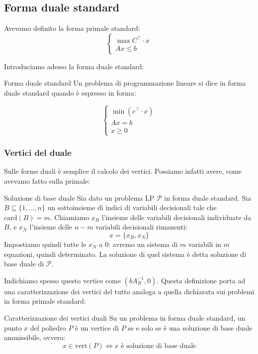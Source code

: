 \documentclass[a4paper,11pt]{article}
\begin{document}
\subsection{Forma duale standard}
Avevamo definito la forma primale standard:
\[
	\begin{cases}
		\max{C^\intercal \cdot x} \\
		Ax \leq b
	\end{cases}
\]

Introduciamo adesso la forma duale standard:
\begin{definition}{Forma duale standard}
	Un problema di programmazione lineare si dice in forma duale standard quando è espresso in forma:
	
	\[
		\begin{cases}
			\min(c^\intercal \cdot x) \\
			Ax = b \\
			x \geq 0
		\end{cases}
	\]

\end{definition}

\subsubsection{Vertici del duale}
Sulle forme duali è semplice il calcolo dei vertici. 
Possiamo infatti avere, come avevamo fatto sulla primale:
\begin{definition}{Soluzione di base duale}
	Sia dato un problema LP $\mathcal{P}$ in forma duale standard.
	Sia $B \subseteq \{ 1, ..., n \}$ un sottoinsieme di indici di variabili decisionali tale che $\mathrm{card}(B) = m$.
	Chiamiamo $x_B$ l'insieme delle variabili decisionali individuate da $B$, e $x_N$ l'insieme delle $n - m$ variabili decisionali rimanenti:
	$$ x = \{x_B, x_N\}$$
	Impostiamo quindi tutte le $x_N$ a 0: avremo un sistema di $m$ variabili in $m$ equazioni, quindi determinato.
	La soluzione di quel sistema è detta soluzione di base duale di $\mathcal{P}$.
\end{definition}

Indichiamo spesso questo vertice come $(bA_B^{-1}, 0)$.
Questa definizione porta ad una caratterizzazione dei vertici del tutto analoga a quella dichiarata sui problemi in forma primale standard:

\begin{theorem}{Caratterizzazione dei vertici duali}
	Su un problema in forma duale standard, un punto $x$ del poliedro $P$ è un vertice di $P$ se e solo se è una soluzione di base duale ammissibile, ovvero:
	$$ 
	x \in \mathrm{vert}(P) \Leftrightarrow \text{$x$ è soluzione di base duale}
	$$
\end{theorem}
\end{document}
